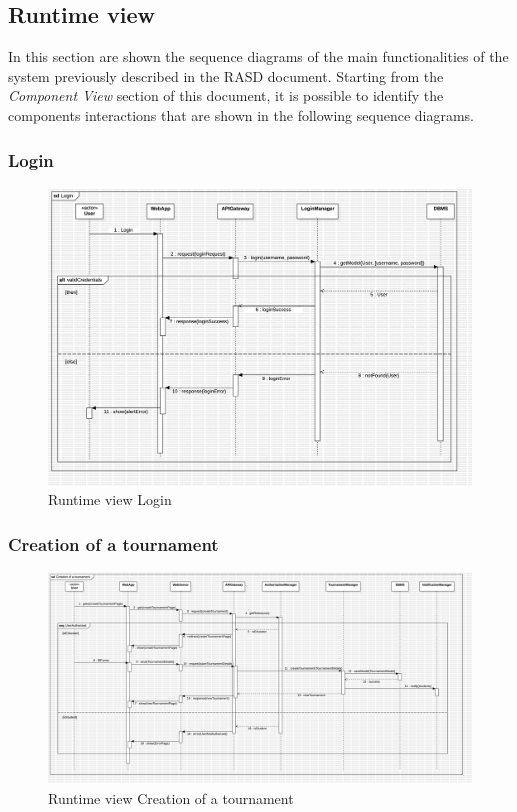 \subsection{Runtime view}
In this section are shown the sequence diagrams of the main functionalities of the system previously described in the RASD document. Starting from the \textit{Component View} section of this document, it is possible to identify the components interactions that are shown in the following sequence diagrams.
\subsubsection*{Login}
\begin{figure}[H]
    \centering
    \includegraphics[width=\textwidth]{Diagrams/LoginSD.jpg}
    \caption{Runtime view Login}
    \label{fig:runtime_view_login}
\end{figure}
\subsubsection*{Creation of a tournament}
\begin{figure}[H]
    \centering
    \includegraphics[width=\textwidth]{Diagrams/CreationTournamentSD.jpg}
    \caption{Runtime view Creation of a tournament}
    \label{fig:runtime_view_tournament_creation}
\end{figure}

